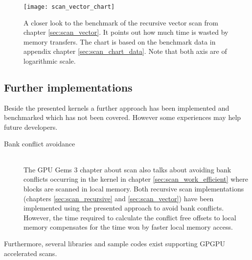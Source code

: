 \begin{figure}
\centering
\texttt{[image: scan\_vector\_chart]}
\caption{A closer look to the benchmark of the recursive vector scan from chapter \ref{sec:scan_vector}. It points out how much time is wasted by memory transfers. The chart is based on the benchmark data in appendix chapter \ref{sec:scan_chart_data}. Note that both axis are of logarithmic scale. }
\label{fig:scan_mem_transfer_chart}
\end{figure}

\subsection{Further implementations}
Beside the presented kernels a further approach has been implemented and benchmarked which has not been covered. However some experiences may help future developers.

\begin{description}
	\item[Bank conflict avoidance] \hfill \\
	The GPU Gems 3 chapter about scan \cite{gpu_gems_3_chapter_39} also talks about avoiding bank conflicts occurring in the kernel in chapter \ref{sec:scan_work_efficient} where blocks are scanned in local memory. Both recursive scan implementations (chapters \ref{sec:scan_recursive} and \ref{sec:scan_vector}) have been implemented using the presented approach to avoid bank conflicts. However, the time required to calculate the conflict free offsets to local memory compensates for the time won by faster local memory access.
\end{description}

\pagebreak

Furthermore, several libraries and sample codes exist supporting GPGPU accelerated scans.

